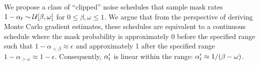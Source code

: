 \documentclass{article} %
\newcommand{\vkl}[1]{\textcolor{blue}{[VK: #1]}}
\newcommand{\TODO}[1]{\textcolor{red}{[TODO: #1]}}
\begin{document}
We propose a class of ``clipped'' noise schedules that sample mask rates $1-\alpha_{t} \sim \mathcal{U}[\beta, \omega]$ for $0 \leq \beta, \omega \leq 1$. We argue that from the perspective of deriving Monte Carlo gradient estimates, these schedules are equivalent to a continuous schedule where the mask probability is approximately 0 before the specified range such that $1-\alpha_{<\beta} \approx \epsilon$ and approximately 1 after the specified range $1-\alpha_{>\omega} \approx 1-\epsilon$. Consequently, $\alpha_{t}'$ is linear within the range: $\alpha_{t}' \approx 1 / (\beta - \omega)$.



\end{document}
